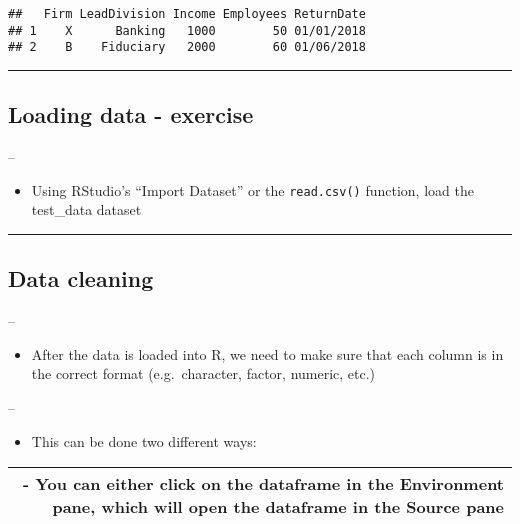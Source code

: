 \documentclass[]{article}
\providecommand{\tightlist}{%
  \setlength{\itemsep}{0pt}\setlength{\parskip}{0pt}}
\begin{document}
\begin{verbatim}
##   Firm LeadDivision Income Employees ReturnDate
## 1    X      Banking   1000        50 01/01/2018
## 2    B    Fiduciary   2000        60 01/06/2018
\end{verbatim}

\begin{center}\rule{0.5\linewidth}{\linethickness}\end{center}

\hypertarget{loading-data---exercise}{%
\subsection{Loading data - exercise}\label{loading-data---exercise}}

--

\begin{itemize}
\tightlist
\item
  Using RStudio's ``Import Dataset'' or the \texttt{read.csv()}
  function, load the test\_data dataset
\end{itemize}

\begin{center}\rule{0.5\linewidth}{\linethickness}\end{center}

\hypertarget{data-cleaning}{%
\subsection{Data cleaning}\label{data-cleaning}}

--

\begin{itemize}
\tightlist
\item
  After the data is loaded into R, we need to make sure that each column
  is in the correct format (e.g.~character, factor, numeric, etc.)
\end{itemize}

--

\begin{itemize}
\tightlist
\item
  This can be done two different ways:
\end{itemize}

\begin{longtable}[]{@{}r@{}}
\toprule
\endhead
\begin{minipage}[t]{0.04\columnwidth}\raggedleft
- You can either click on the dataframe in the Environment pane, which
will open the dataframe in the Source pane\strut
\end{minipage}\tabularnewline
\bottomrule
\end{longtable}
\end{document}
